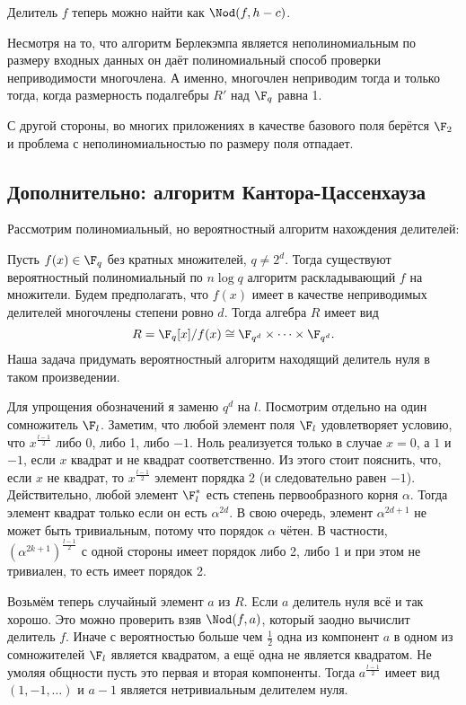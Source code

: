 Делитель $f$ теперь можно найти как $\Nod(f,h-c)$.

\endproof
\ethrm

\rm Несмотря на то, что алгоритм Берлекэмпа является неполиномиальным по размеру входных данных он даёт полиномиальный способ проверки неприводимости многочлена. А именно, многочлен неприводим тогда и только тогда, когда размерность подалгебры $R'$ над $\F_q$ равна 1.

С другой стороны, во многих приложениях в качестве базового поля берётся $\F_2$ и проблема с неполиномиальностью по размеру поля отпадает.
\erm


\subsection{Дополнительно: алгоритм Кантора-Цассенхауза}

Рассмотрим полиномиальный, но вероятностный алгоритм нахождения делителей:

 Пусть $f(x)\in \F_q$ без кратных множителей, $q\neq 2^d$. Тогда существуют вероятностный полиномиальный по $n\log q$  алгоритм раскладывающий $f$ на множители.
\proof
Будем предполагать, что $f(x)$ имеет в качестве неприводимых делителей многочлены степени ровно $d$. Тогда алгебра $R$ имеет вид
$$R= \F_q[x]/f(x)\cong \F_{q^d}\times \dots \times \F_{q^d}.$$ 
Наша задача придумать вероятностный алгоритм находящий делитель нуля в таком произведении.

Для упрощения обозначений я заменю $q^d$ на $l$. Посмотрим отдельно на один сомножитель $\F_{l}$. Заметим, что любой элемент поля $\F_l$ удовлетворяет условию, что $x^{\frac{l-1}{2}}$ либо 0, либо 1, либо $-1$. Ноль реализуется только в случае $x=0$, а $1$ и $-1$, если $x$ квадрат и не квадрат соответственно. Из этого стоит пояснить, что, если $x$ не квадрат, то $x^{\frac{l-1}{2}}$ элемент порядка 2 (и следовательно равен $-1$). Действительно, любой элемент $\F_l^*$ есть степень первообразного корня $\alpha$. Тогда элемент квадрат  только если он есть $\alpha^{2d}$. В свою очередь, элемент $\alpha^{2d+1}$ не может быть тривиальным, потому что порядок $\alpha$ чётен. В частности, $(\alpha^{2k+1})^{\frac{l-1}{2}}$ с одной стороны имеет порядок либо 2, либо 1 и при этом не тривиален, то есть имеет порядок 2.


Возьмём теперь случайный элемент $a$ из $R$. Если $a$ делитель нуля всё и так хорошо. Это можно проверить взяв $\Nod(f,a)$, который заодно вычислит делитель $f$. Иначе с вероятностью больше чем  $\frac{1}{2}$ одна из компонент $a$ в одном из сомножителей $\F_l$ является квадратом, а ещё одна не является квадратом. Не умоляя общности пусть это первая и вторая компоненты. Тогда $a^{\frac{l-1}{2}}$ имеет вид $(1,-1,\dots)$ и $a-1$ является нетривиальным делителем нуля.  
\endproof
\ethrm

